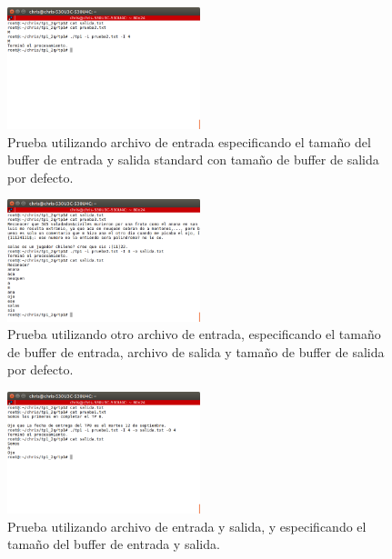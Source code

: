 \documentclass[a4paper]{article}
\begin{document}
\begin{figure}[!htp]
\begin{center}
\includegraphics[width=0.5\textwidth]{imagenes_casosDePrueba_tp1/prueba2_entrada_4.png}
\caption{Prueba utilizando archivo de entrada especificando el tamaño del buffer de entrada y salida standard con tamaño de buffer de salida por defecto.} \label{fig001}
\end{center}
\end{figure}

\begin{figure}[!htp]
\begin{center}
\includegraphics[width=0.5\textwidth]{imagenes_casosDePrueba_tp1/prueba3_archivoEntrada_4_salida_default.png}
\caption{Prueba utilizando otro archivo de entrada, especificando el tamaño de buffer de entrada, archivo de salida y tamaño de buffer de salida por defecto.} \label{fig001}
\end{center}
\end{figure}

\begin{figure}[!htp]
\begin{center}
\includegraphics[width=0.5\textwidth]{imagenes_casosDePrueba_tp1/prueba1_archivoEntrada_4_salida_4.png}
\caption{Prueba utilizando archivo de entrada y salida, y especificando el tamaño del buffer de entrada y salida.} \label{fig001}
\end{center}
\end{figure}
\end{document}
